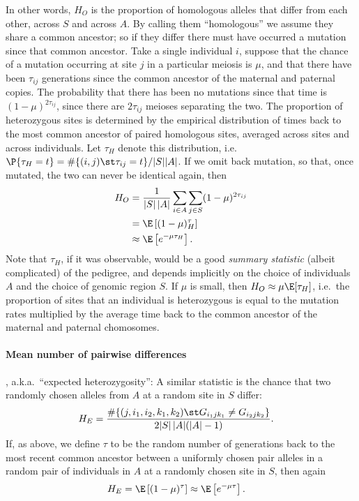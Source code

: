 In other words, $H_O$ is the proportion of homologous alleles that differ from each other, across $S$ and across $A$.
By calling them ``homologous'' we assume they share a common ancestor;
so if they differ there must have occurred a mutation since that common ancestor.
Take a single individual $i$,
suppose that the chance of a mutation occurring at site $j$ in a particular meiosis is $\mu$,
and that there have been $\tau_{ij}$ generations since the common ancestor of the maternal and paternal copies.
The probability that there has been no mutations since that time is $(1-\mu)^{2 \tau_{ij}}$,
since there are $2 \tau_{ij}$ meioses separating the two.
The proportion of heterozygous sites is determined by the empirical distribution 
of times back to the most common ancestor of paired homologous sites, averaged across sites and across individuals.
Let $\tau_H$ denote this distribution, i.e.\ $\P\{ \tau_H = t \} = \#\{ (i,j) \st \tau_{ij} = t \} / |S||A|$.
If we omit back mutation, so that, once mutated, the two can never be identical again,
then
\begin{align}
  H_O &= \frac{1}{|S|\,|A|} \sum_{i \in A} \sum_{j \in S} (1-\mu)^{2 \tau_{ij}} \\
    &= \E\left[ (1-\mu)^\tau_H \right] \\
    &\approx \E\left[ e^{-\mu \tau_H } \right] .
\end{align}
Note that $\tau_H$, if it was observable, would be a good \emph{summary statistic} (albeit complicated) of the pedigree,
and depends implicitly on the choice of individuals $A$ and the choice of genomic region $S$.
If $\mu$ is small, then $H_O \approx \mu \E[ \tau_H ]$,
i.e.\ the proportion of sites that an individual is heterozygous
is equal to the mutation rates multiplied by the average time back to the common ancestor of the maternal and paternal chomosomes.



\paragraph{Mean number of pairwise differences}, a.k.a.\ ``expected heterozygosity'':
A similar statistic is the chance that two randomly chosen alleles from $A$ at a random site in $S$ differ:
\begin{align}
  H_E &= \frac{ \#\{ (j,i_1,i_2,k_1,k_2) \st G_{i_1jk_1} \neq G_{i_2jk_2}  \} }{2|S|\,|A|(|A|-1)}  .
\end{align}
If, as above, we define $\tau$ to be the random number of generations back to the most recent common ancestor
between a uniformly chosen pair alleles in a random pair of individuals in $A$ at a randomly chosen site in $S$,
then again
\begin{align}
  H_E &= \E\left[ (1-\mu)^\tau \right] \approx \E\left[ e^{-\mu \tau} \right] .
\end{align}


